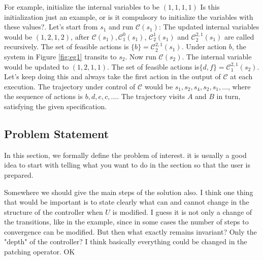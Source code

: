 \begin{example}
	For example, initialize the internal variables to be $ (1,1,1,1) $ {\color{purple} Is this initialization just an example, or is it compulsory to initialize the variables with these values?}. Let's start from $ s_1 $ and run $ \mathcal{C}(s_1) $: The updated internal variables would be $ (1,2,1,2) $, after $ \mathcal{C}(s_1), \mathcal{C}^0_1(s_1)$, $ \mathcal{C}^1_2(s_1) $ and $ \mathcal{C}^{2,1}_2(s_1) $ are called recursively. The set of feasible actions is $ \{b\}= \mathcal{C}^{2,1}_2(s_1) $. Under action $ b $, the system in Figure \ref{fig:eg1} transits to $ s_2 $. Now run $ \mathcal{C}(s_2) $. The internal variable would be updated to $ (1,2,1,1) $. The set of feasible actions is$ \{d,f\}=\mathcal{C}^{2,1}_1(s_2) $. Let's keep doing this and always take the first action in the output of $ \mathcal{C} $ at each execution. The trajectory under control of $\mathcal{C} $ would be $ s_1,s_2,s_4,s_2,s_1,...$, where the sequence of actions is $ b,d,e,c,... $. The trajectory visits $ A $ and $ B $ in turn, satisfying the given specification.
	
\end{example}


\subsection{Problem Statement}
\label{sec:prob}
In this section, we formally define the problem of interest. {\color{blue}it is usually a good idea to start with telling what you want to do in the section so that the user is prepared.}

{\color{purple} Somewhere we should give the main steps of the solution also. I think one thing that would be important is to state clearly what can and cannot change in the structure of the controller when $U$ is modified. I guess it is not only a change of the transitions, like in the example, since in some cases the number of steps to convergence can be modified. But then what exactly remains invariant? Only the "depth" of the controller? } {\color{teal} I think basically everything could be changed in the patching operator.} {\color{purple} OK}

